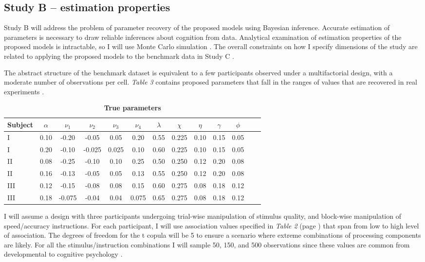 \documentclass[12pt]{article}
\begin{document}
\subsection{Study B – estimation properties}
	Study B will address the problem of parameter recovery of the proposed models using Bayesian inference. Accurate estimation of parameters is necessary to draw reliable inferences about cognition from data. Analytical examination of estimation properties of the proposed models is intractable, so I will use Monte Carlo simulation \citep{RobCas2004,GamLop2006,GelCar2013}. The overall constraints on how I specify dimensions of the study are related to applying the proposed models to the benchmark data in Study C \citep{RatRou1998}.

	The abstract structure of the benchmark dataset is equivalent to a few participants observed under a multifactorial design, with a moderate number of observations per cell. \emph{Table 3} contains proposed parameters that fall in the ranges of values that are recovered in real experiments \citep{MatWag2009}.
\begin{table}[H]
\centering
\caption{\textbf{True parameters}}
\label{tab:3}
\begin{tabular}{|l*{11}{|c}|r}
\hline
Subject & $\alpha$ & $\nu_1$ & $\nu_2$ & $\nu_3$ & $\nu_4$ & $\lambda$ & $\chi$ & $\eta$ & $\gamma$ & $\phi$ \\ \hline
I & 0.10 & -0.20 & -0.05 & 0.05 & 0.20 & 0.55 & 0.225 & 0.10 & 0.15 & 0.05 \\ \hline
I & 0.20 & -0.10 & -0.025 & 0.025 & 0.10 & 0.60 & 0.225 & 0.10 & 0.15 & 0.05 \\ \hline
II & 0.08 & -0.25 & -0.10 & 0.10 & 0.25 & 0.50 & 0.250 & 0.12 & 0.20 & 0.08 \\ \hline
II & 0.16 & -0.13 & -0.05 & 0.05 & 0.13 & 0.55 & 0.250 & 0.12 & 0.20 & 0.08 \\ \hline
III & 0.12 & -0.15 & -0.08 & 0.08 & 0.15 & 0.60 & 0.275 & 0.08 & 0.18 & 0.12 \\ \hline
III & 0.18 & -0.075 & -0.04 & 0.04 & 0.075 & 0.65 & 0.275 & 0.08 & 0.18 & 0.12 \\
\hline
\end{tabular}
\end{table}
\noindent I will assume a design with three participants undergoing trial-wise manipulation of stimulus quality, and block-wise manipulation of speed/accuracy instructions. For each participant, I will use association values specified in \emph{Table 2} (page \pageref{tab:2}) that span from low to high level of association. The degrees of freedom for the t copula will be 5 to ensure a scenario where extreme combinations of processing components are likely. For all the stimulus/instruction combinations I will sample 50, 150, and 500 observations since these values are common from developmental to cognitive psychology \citep{Luc1986,Wag2009,RouLu2005}.
    
\end{document}
